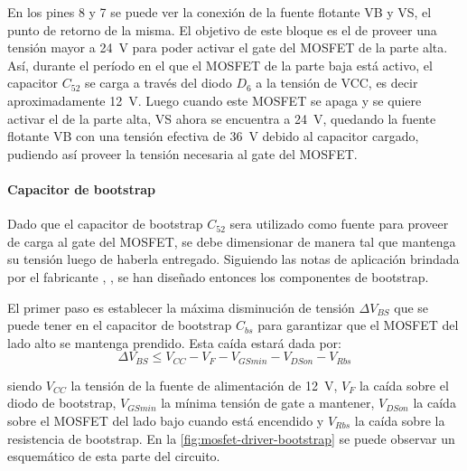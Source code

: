 \documentclass[../et.tex]{subfiles}
\begin{document}
    En los pines 8 y 7 se puede ver la conexión de la fuente flotante VB y VS, el punto de retorno de la misma. El objetivo de este bloque es el de proveer una tensión mayor a \SI{24}{V} para poder activar el gate del MOSFET de la parte alta. Así, durante el período en el que el MOSFET de la parte baja está activo, el capacitor $C_{52}$ se carga a través del diodo $D_6$ a la tensión de VCC, es decir aproximadamente \SI{12}{V}. Luego cuando este MOSFET se apaga y se quiere activar el de la parte alta, VS ahora se encuentra a \SI{24}{V}, quedando la fuente flotante VB con una tensión efectiva de \SI{36}{V} debido al capacitor cargado, pudiendo así proveer la tensión necesaria al gate del MOSFET.

    \paragraph{Capacitor de bootstrap}
    Dado que el capacitor de bootstrap $C_{52}$ sera utilizado como fuente para proveer de carga al gate del MOSFET, se debe dimensionar de manera tal que mantenga su tensión luego de haberla entregado. Siguiendo las notas de aplicación brindada por el fabricante \cite{ir:an-978}, \cite{ir:dt04-04}, se han diseñado entonces los componentes de bootstrap.

  El primer paso es establecer la máxima disminución de tensión $\Delta V_{BS}$ que se puede tener en el capacitor de bootstrap $C_{bs}$ para garantizar que el MOSFET del lado alto se mantenga prendido. Esta caída estará dada por:
    \begin{equation}
      \label{eq:bootstrap-deltavbs}
      \Delta V_{BS} \leq V_{CC} - V_F - V_{GS min} - V_{DS on} - V_{Rbs}
    \end{equation}

  siendo $V_{CC}$ la tensión de la fuente de alimentación de \SI{12}{V}, $V_F$ la caída sobre el diodo de bootstrap, $V_{GS min}$ la mínima tensión de gate a mantener, $V_{DS on}$ la caída sobre el MOSFET del lado bajo cuando está encendido y $V_{Rbs}$ la caída sobre la resistencia de bootstrap. En la \autoref{fig:mosfet-driver-bootstrap} se puede observar un esquemático de esta parte del circuito.
\end{document}

